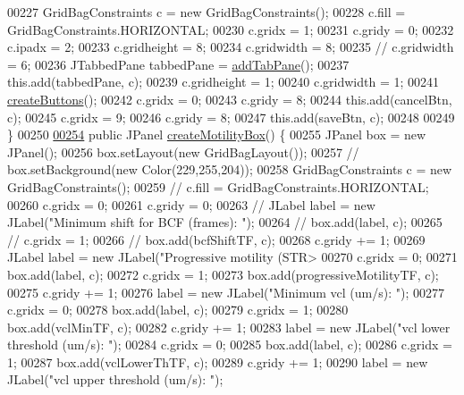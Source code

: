 \begin{DoxyCode}
00227     GridBagConstraints c = \textcolor{keyword}{new} GridBagConstraints();
00228     c.fill = GridBagConstraints.HORIZONTAL;
00230     c.gridx = 1;
00231     c.gridy = 0;
00232     c.ipadx = 2;
00233     c.gridheight = 8;
00234     c.gridwidth = 8;
00235     \textcolor{comment}{// c.gridwidth = 6;}
00236     JTabbedPane tabbedPane = \hyperlink{classgui_1_1_settings_window_a36518806dd93bf1bcbbd809663c30594}{addTabPane}();
00237     this.add(tabbedPane, c);
00239     c.gridheight = 1;
00240     c.gridwidth = 1;
00241     \hyperlink{classgui_1_1_settings_window_a48645e737c205837da587e63e4661cc4}{createButtons}();
00242     c.gridx = 0;
00243     c.gridy = 8;
00244     this.add(cancelBtn, c);
00245     c.gridx = 9;
00246     c.gridy = 8;
00247     this.add(saveBtn, c);
00248 
00249   \}
00250 
\hypertarget{_settings_window_8java_source_l00254}{}\hyperlink{classgui_1_1_settings_window_ac852b9b8b2e0cd2bf5bc764d41e2b0ec}{00254}   \textcolor{keyword}{public} JPanel \hyperlink{classgui_1_1_settings_window_ac852b9b8b2e0cd2bf5bc764d41e2b0ec}{createMotilityBox}() \{
00255     JPanel box = \textcolor{keyword}{new} JPanel();
00256     box.setLayout(\textcolor{keyword}{new} GridBagLayout());
00257     \textcolor{comment}{// box.setBackground(new Color(229,255,204));}
00258     GridBagConstraints c = \textcolor{keyword}{new} GridBagConstraints();
00259     \textcolor{comment}{// c.fill = GridBagConstraints.HORIZONTAL;}
00260     c.gridx = 0;
00261     c.gridy = 0;
00263 \textcolor{comment}{//    JLabel label = new JLabel("Minimum shift for BCF (frames): ");}
00264 \textcolor{comment}{//    box.add(label, c);}
00265 \textcolor{comment}{//    c.gridx = 1;}
00266 \textcolor{comment}{//    box.add(bcfShiftTF, c);}
00268 \textcolor{comment}{}    c.gridy += 1;
00269     JLabel label = \textcolor{keyword}{new} JLabel(\textcolor{stringliteral}{"Progressive motility (STR>%
00270     c.gridx = 0;
00271     box.add(label, c);
00272     c.gridx = 1;
00273     box.add(progressiveMotilityTF, c);
00275     c.gridy += 1;
00276     label = \textcolor{keyword}{new} JLabel(\textcolor{stringliteral}{"Minimum vcl (um/s): "});
00277     c.gridx = 0;
00278     box.add(label, c);
00279     c.gridx = 1;
00280     box.add(vclMinTF, c);
00282     c.gridy += 1;
00283     label = \textcolor{keyword}{new} JLabel(\textcolor{stringliteral}{"vcl lower threshold (um/s): "});
00284     c.gridx = 0;
00285     box.add(label, c);
00286     c.gridx = 1;
00287     box.add(vclLowerThTF, c);
00289     c.gridy += 1;
00290     label = \textcolor{keyword}{new} JLabel(\textcolor{stringliteral}{"vcl upper threshold (um/s): "});
}
\end{DoxyCode}
